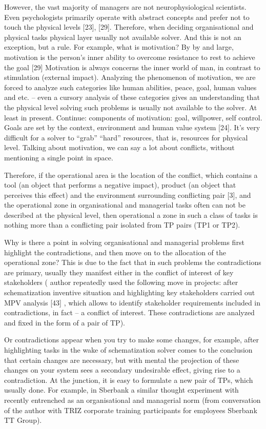 \documentclass[11pt,a4paper]{book}
\begin{document}
However, the vast majority of managers are not neurophysiological scientists.
Even psychologists primarily operate with abstract concepts and prefer not to
touch the physical levels [23], [29]. Therefore, when deciding organisational
and physical tasks physical layer usually not available solver. And this is
not an exception, but a rule. For example, what is motivation? By by and
large, motivation is the person’s inner ability to overcome resistance to rest
to achieve the goal [29] Motivation is always concerns the inner world of man,
in contrast to stimulation (external impact). Analyzing the phenomenon of
motivation, we are forced to analyze such categories like human abilities,
peace, goal, human values and etc. -- even a cursory analysis of these
categories gives an understanding that the physical level solving such
problems is usually not available to the solver. At least in
present. Continue: components of motivation: goal, willpower, self
control. Goals are set by the context, environment and human value system
[24]. It’s very difficult for a solver to “grab” “hard” resources, that is,
resources for physical level. Talking about motivation, we can say a lot about
conflicts, without mentioning a single point in space.

Therefore, if the operational area is the location of the conflict, which
contains a tool (an object that performs a negative impact), product (an
object that perceives this effect) and the environment surrounding conflicting
pair [3], and the operational zone in organisational and managerial tasks
often can not be described at the physical level, then operational a zone in
such a class of tasks is nothing more than a conflicting pair isolated from TP
pairs (TP1 or TP2).

Why is there a point in solving organisational and managerial problems first
highlight the contradictions, and then move on to the allocation of the
operational zone?  This is due to the fact that in such problems the
contradictions are primary, usually they manifest either in the conflict of
interest of key stakeholders ( author repeatedly used the following move in
projects: after schematization inventive situation and highlighting key
stakeholders carried out MPV analysis [43] , which allows to identify
stakeholder requirements included in contradictions, in fact -- a conflict of
interest. These contradictions are analyzed and fixed in the form of a pair of
TP).

Or contradictions appear when you try to make some changes, for example, after
highlighting tasks in the wake of schematization solver comes to the
conclusion that certain changes are necessary, but with mental the projection
of these changes on your system sees a secondary undesirable effect, giving
rise to a contradiction. At the junction, it is easy to formulate a new pair
of TPs, which usually done. For example, in Sberbank a similar thought
experiment with recently entrenched as an organisational and managerial norm
(from conversation of the author with TRIZ corporate training participants for
employees Sberbank TT Group).
\end{document}
